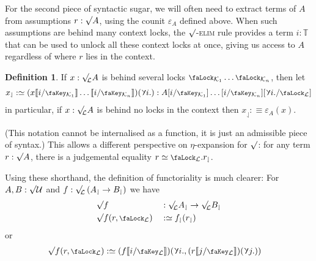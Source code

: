 \documentclass[10pt]{article}
\theoremstyle{definition}
\newtheorem{definition}[theorem]{Definition}
\let\oldequiv\equiv%
\renewcommand{\equiv}{\simeq}
\newcommand{\defeq}{\oldequiv}
\newcommand{\rulen}[1]{\textsc{#1}}
\newcommand*{\univ}{\mathcal{U}}
\newcommand{\lock}{\mathchoice {\scalebox{0.8}{\text{\faLock}}}
  {\scalebox{0.8}{\text{\faLock}}} {\scalebox{0.5}{\text{\faLock}}}
  {\scalebox{0.4}{\text{\faLock}}} }
\newcommand{\key}{\mathchoice
  {\scalebox{0.8}{\text{\faKey}}} {\scalebox{0.8}{\text{\faKey}}}
  {\scalebox{0.5}{\text{\faKey}}} {\scalebox{0.4}{\text{\faKey}}} }
\newcommand{\rbindsym}{\raisebox{-0.5pt}{\scalerel*{\reflectbox{\rotatebox[origin=c]{185}{$\lambda$}}}{\lambda}}}
\newcommand{\rbind}[1]{\rbindsym{} #1.}
\newcommand{\Tiny}{\mathbb{T}}
\newcommand{\lockn}[1]{\mathcal{#1}}
\newcommand{\ctxlocke}[1]{\lock_{#1}}
\newcommand{\ctxlock}[1]{\ctxlocke{\lockn{#1}}}
\newcommand{\stubra}[1]{\llbracket #1 \rrbracket}
\newcommand{\admbra}[1]{[ #1 ]}
\newcommand{\subkeye}[2]{\admbra{#1/\key_{#2}}}
\newcommand{\substucke}[2]{\stubra{#1/\key_{#2}}}
\newcommand{\substuck}[2]{\substucke{#1}{\lockn{#2}}}
\newcommand{\sublock}[2]{\admbra{\rbindsym{} #2. /\lock_{\lockn{#1}} }}
\newcommand{\rformsym}{\surd}
\newcommand{\rforme}[2]{\ThisStyle{\raisebox{0.07em}{$\SavedStyle \surd_{\hspace{-0.25em}#1}$}} #2}
\newcommand{\rform}[2]{\rforme{\lockn{#1}}{#2}}
\newcommand{\rformu}[1]{\ThisStyle{\raisebox{0.07em}{$\SavedStyle \surd$}} #1}
\newcommand{\rintroe}[2]{\lock_{#1}. #2}
\newcommand{\rintro}[2]{\rintroe{\lockn{#1}}{#2}}
\newcommand{\rget}[1]{{#1}_{\downharpoonleft}}
\begin{document}
For the second piece of syntactic sugar, we will often need to extract terms of $A$ from assumptions
$r : \rformu{A}$, using the counit $\varepsilon_A$ defined above. When
such assumptions are behind many context locks, the
\rulen{$\surd$-elim} rule provides a term $i : \Tiny$ that can be used
to unlock all these context locks at once, giving us access to $A$
regardless of where $r$ lies in the context.
\begin{definition}
  If $x : \rform{L} A$ is behind several locks
  $\ctxlocke{\lockn{K}_1} \dots \ctxlocke{\lockn{K}_n}$, then let
  \begin{align*}
    \rget{x} :\defeq (x \substucke{i}{\lockn{K}_1}
    \dots \substucke{i}{\lockn{K}_n})(\rbind{i}) : A \subkeye{i}{\lockn{K}_1}
    \dots \subkeye{i}{\lockn{K}_n}\sublock{L}{i}
  \end{align*}
  in particular, if $x : \rform{L} A$ is behind no locks in the
  context then $\rget{x} :\defeq \varepsilon_A(x)$.
\end{definition}
(This notation cannot be internalised as a function, it is just an
admissible piece of syntax.)  This allows a different perspective on
$\eta$-expansion for $\rformsym$: for any term $r : \rformu A$, there
is a judgemental equality $r \defeq \rintro{L}{\rget{r}}$.

Using these shorthand, the definition of functoriality is much clearer:
For $A,B : \rformu \univ$ and
$f : \rform{L}\left(\rget{A} \to \rget{B}\right)$ we have
\begin{alignat*}{2}
  &\rformu f &&: \rform{L}\rget{A} \to \rform{L}\rget{B} \\
  &\rformu f(r, \ctxlock{L}) &&:\defeq \rget{f}(\rget{r})
\end{alignat*}
or
\begin{align*}
  \rformu f(r, \ctxlock{L}) &:\defeq (f\substuck{i}{L})(\rbind{i}, (r\substuck{j}{L})(\rbind{j}))
\end{align*}
\end{document}
